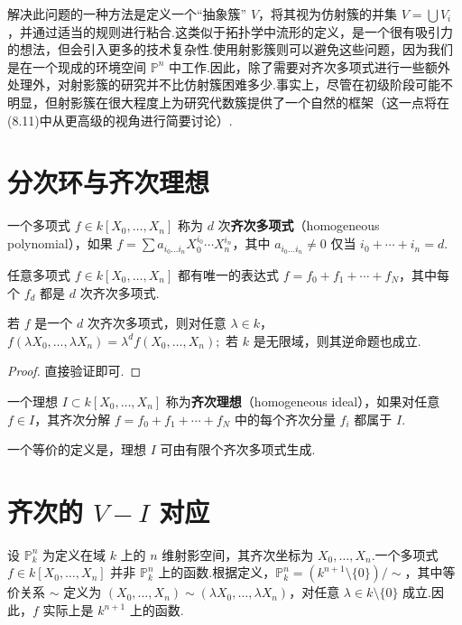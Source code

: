 解决此问题的一种方法是定义一个“抽象簇” \(V\)，将其视为仿射簇的并集 \(V = \bigcup V_i\)，并通过适当的规则进行粘合.这类似于拓扑学中流形的定义，是一个很有吸引力的想法，但会引入更多的技术复杂性.使用射影簇则可以避免这些问题，因为我们是在一个现成的环境空间 \({\mathbb{P}}^n\) 中工作.因此，除了需要对齐次多项式进行一些额外处理外，对射影簇的研究并不比仿射簇困难多少.事实上，尽管在初级阶段可能不明显，但射影簇在很大程度上为研究代数簇提供了一个自然的框架（这一点将在(8.11)中从更高级的视角进行简要讨论）.

\section{分次环与齐次理想}

\begin{definition}
一个多项式 \(f \in k[X_0, \ldots, X_n]\) 称为 \(d\) 次\textbf{齐次多项式}（homogeneous polynomial），如果
\(
f = \sum a_{i_0\ldots i_n}X_0^{i_0}\cdots X_n^{i_n} \text{，其中 } a_{i_0\ldots i_n} \neq 0 \text{ 仅当 } i_0 + \cdots + i_n = d.
\)
\end{definition}
任意多项式 \(f \in k[X_0, \ldots, X_n]\) 都有唯一的表达式 \(f = f_0 + f_1 + \cdots + f_N\)，其中每个 \(f_d\) 都是 \(d\) 次齐次多项式.

\begin{proposition}
若 \(f\) 是一个 \(d\) 次齐次多项式，则对任意 \(\lambda \in k\)，
\(
f(\lambda X_0, \ldots, \lambda X_n) = \lambda^d f(X_0, \ldots, X_n);
\)
若 \(k\) 是无限域，则其逆命题也成立.
\end{proposition}
\begin{proof}
直接验证即可.
\end{proof}

\begin{definition}
一个理想 \(I \subset k[X_0, \ldots, X_n]\) 称为\textbf{齐次理想}（homogeneous ideal），如果对任意 \(f \in I\)，其齐次分解 \(f = f_0 + f_1 + \cdots + f_N\) 中的每个齐次分量 \(f_i\) 都属于 \(I\).
\end{definition}

一个等价的定义是，理想 \(I\) 可由有限个齐次多项式生成.

\section{齐次的 \(V-I\) 对应}

设 \({\mathbb{P}}_k^n\) 为定义在域 \(k\) 上的 \(n\) 维射影空间，其齐次坐标为 \(X_0, \ldots, X_n\).一个多项式 \(f \in k[X_0, \ldots, X_n]\) 并非 \({\mathbb{P}}_k^n\) 上的函数.根据定义，\({\mathbb{P}}_k^n = (k^{n+1} \setminus \{0\}) / \sim\)，其中等价关系 \(\sim\) 定义为 \((X_0, \ldots, X_n) \sim (\lambda X_0, \ldots, \lambda X_n)\)，对任意 \(\lambda \in k \setminus \{0\}\) 成立.因此，\(f\) 实际上是 \(k^{n+1}\) 上的函数.

